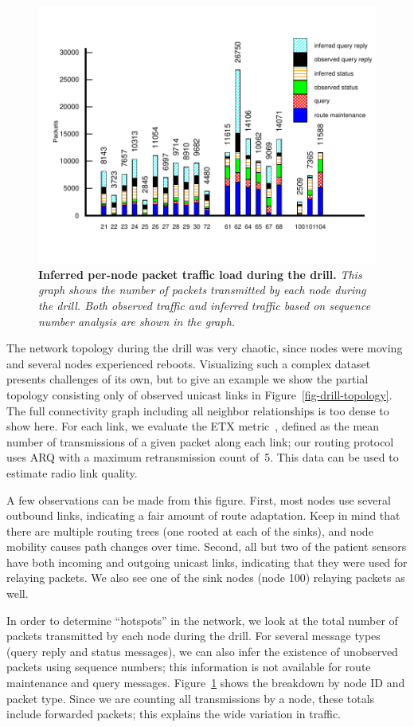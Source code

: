 \begin{figure}[t]
\begin{center}
\includegraphics[width=0.6\hsize]{./resources/livenet-sensys07/figs/hotspot/inferred-hotspot.pdf}
\end{center}
\caption{\small {\bf Inferred per-node packet traffic load during the drill.}
{\em This graph shows the number of packets transmitted 
by each node during the drill. Both observed traffic and inferred traffic
based on sequence number analysis are shown in the graph.}}
\label{fig-drill-hotspot}
\end{figure}

The network topology during the drill was very chaotic, since nodes
were moving and several nodes experienced reboots. Visualizing such a
complex dataset presents challenges of its own, but to give an example
we show the partial topology consisting only of observed unicast links
in Figure~\ref{fig-drill-topology}. The full connectivity graph
including all neighbor relationships is too dense to show here.
For each link, we evaluate the ETX metric~\cite{etx}, 
defined as the mean number of transmissions of a 
given packet along each link; our routing protocol uses ARQ with a
maximum retransmission count of~5. This data can be used to 
estimate radio link quality.

A few observations can be made from this figure. First, most nodes
use several outbound links, indicating a fair amount of route
adaptation. Keep in mind
that there are multiple routing trees (one rooted at each of the sinks), 
and node mobility causes path changes over time.
Second, all but two of the patient sensors have both incoming and outgoing
unicast links, indicating that they were used for relaying packets. We
also see one of the sink nodes (node 100) relaying packets as well. 

In order to determine ``hotspots'' in the network, we look at the
total number of packets transmitted by each node during the drill.
For several message types (query reply and status messages), we can
also infer the existence of unobserved packets using sequence numbers; 
this information is not available for route maintenance and query messages.
Figure~\ref{fig-drill-hotspot} shows the breakdown by node ID and
packet type. Since we are counting all transmissions by a node, these
totals include forwarded packets; this explains the wide variation in 
traffic. 

